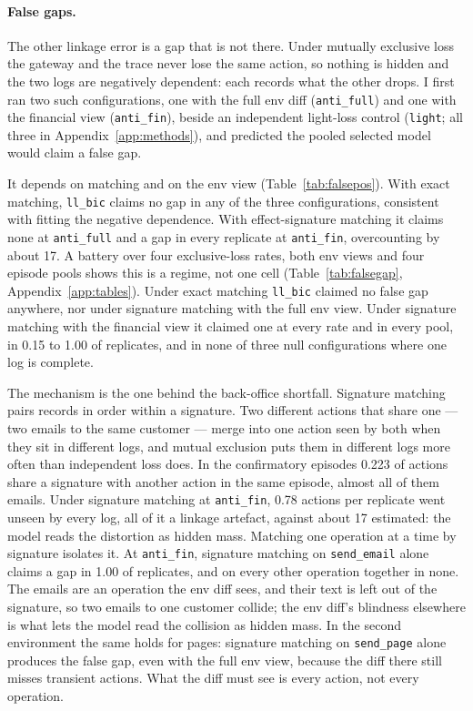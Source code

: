 \documentclass[11pt]{article}
\begin{document}
\paragraph{False gaps.}
The other linkage error is a gap that is not there. Under mutually exclusive loss the gateway and the trace never
lose the same action, so nothing is hidden and the two logs are negatively
dependent: each records what the other drops. I first ran two such
configurations, one with the full env diff (\texttt{anti\_full}) and one with
the financial view (\texttt{anti\_fin}), beside an independent light-loss control
(\texttt{light}; all three in Appendix~\ref{app:methods}), and predicted the
pooled selected model would claim a false gap.


It depends on matching and on the env view (Table~\ref{tab:falsepos}). With
exact matching, \texttt{ll\_bic} claims no gap in any of the three
configurations, consistent with fitting the negative dependence. With
effect-signature matching it claims none at \texttt{anti\_full} and a gap in
every replicate at \texttt{anti\_fin}, overcounting by about 17. A battery over
four exclusive-loss rates, both env views and four episode pools shows this is a
regime, not one cell (Table~\ref{tab:falsegap}, Appendix~\ref{app:tables}). Under exact matching
\texttt{ll\_bic} claimed no false gap anywhere, nor under signature matching with
the full env view. Under signature matching with the financial view it claimed
one at every rate and in every pool, in 0.15 to 1.00 of replicates, and in none
of three null configurations where one log is complete.


The mechanism is the one behind the back-office shortfall. Signature matching
pairs records in order within a signature. Two different actions that share one
--- two emails to the same customer --- merge into one action seen by both when
they sit in different logs, and mutual exclusion puts them in different logs
more often than independent loss does. In the confirmatory episodes 0.223 of
actions share a signature with another action in the same episode, almost all of
them emails. Under signature matching at \texttt{anti\_fin}, 0.78 actions per
replicate went unseen by every log, all of it a linkage artefact, against about
17 estimated: the model reads the distortion as hidden mass. Matching one
operation at a time by signature isolates it. At \texttt{anti\_fin}, signature
matching on \texttt{send\_email} alone claims a gap in 1.00 of replicates, and on
every other operation together in none. The emails are an operation the env diff
sees, and their text is left out of the signature, so two emails to one
customer collide; the env diff's blindness elsewhere is what lets the model read
the collision as hidden mass. In the second environment the same holds for
pages: signature matching on \texttt{send\_page} alone produces the false gap,
even with the full env view, because the diff there still misses transient
actions. What the diff must see is every action, not every operation.
\end{document}
